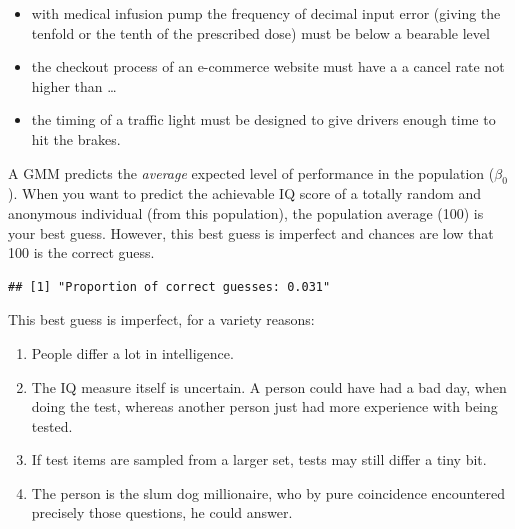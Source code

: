 \documentclass[]{svmono}
\newenvironment{Shaded}{\begin{snugshade}}{\end{snugshade}}
\newcommand{\KeywordTok}[1]{\textcolor[rgb]{0.13,0.29,0.53}{\textbf{#1}}}
\newcommand{\DataTypeTok}[1]{\textcolor[rgb]{0.13,0.29,0.53}{#1}}
\newcommand{\DecValTok}[1]{\textcolor[rgb]{0.00,0.00,0.81}{#1}}
\newcommand{\StringTok}[1]{\textcolor[rgb]{0.31,0.60,0.02}{#1}}
\newcommand{\CommentTok}[1]{\textcolor[rgb]{0.56,0.35,0.01}{\textit{#1}}}
\newcommand{\OperatorTok}[1]{\textcolor[rgb]{0.81,0.36,0.00}{\textbf{#1}}}
\newcommand{\NormalTok}[1]{#1}
\providecommand{\tightlist}{%
  \setlength{\itemsep}{0pt}\setlength{\parskip}{0pt}}
\begin{document}
\begin{itemize}
\tightlist
\item
  with medical infusion pump the frequency of decimal input error
  (giving the tenfold or the tenth of the prescribed dose) must be below
  a bearable level
\item
  the checkout process of an e-commerce website must have a a cancel
  rate not higher than \ldots{}
\item
  the timing of a traffic light must be designed to give drivers enough
  time to hit the brakes.
\end{itemize}

A GMM predicts the \emph{average} expected level of performance in the
population (\(\beta_0\)). When you want to predict the achievable IQ
score of a totally random and anonymous individual (from this
population), the population average (100) is your best guess. However,
this best guess is imperfect and chances are low that 100 is the correct
guess.

\begin{Shaded}
\end{Shaded}

\begin{verbatim}
## [1] "Proportion of correct guesses: 0.031"
\end{verbatim}

This best guess is imperfect, for a variety reasons:

\begin{enumerate}
\def\labelenumi{\arabic{enumi}.}
\tightlist
\item
  People differ a lot in intelligence.
\item
  The IQ measure itself is uncertain. A person could have had a bad day,
  when doing the test, whereas another person just had more experience
  with being tested.
\item
  If test items are sampled from a larger set, tests may still differ a
  tiny bit.
\item
  The person is the slum dog millionaire, who by pure coincidence
  encountered precisely those questions, he could answer.
\end{enumerate}
\end{document}
